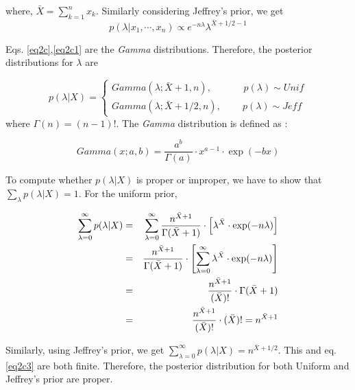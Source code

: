 \documentclass[11pt]{article}
\begin{document}
where, $\bar{X} = \sum\limits_{k=1}^{n} x_k$.  Similarly considering Jeffrey's prior, we get
\vspace{-10pt}
\begin{equation}
  p(\lambda | x_1, \cdots, x_n) \propto  e^{-n\lambda} \lambda^{\bar{X}+1/2-1} 
\label{eq2c1}
\end{equation}

Eqs. \ref{eq2c},\ref{eq2c1} are the \emph{Gamma} distributions. Therefore, the posterior distributions for $\lambda$ are

\begin{equation*}
  p(\lambda | X) = 
\begin{cases}
   Gamma(\lambda; \bar{X}+1, n), \; \; \; \; \; \; \; \; \; \; \; \;  \mbox{$p(\lambda) \sim Unif$} \\
    Gamma(\lambda; \bar{X}+1/2, n), \; \; \; \; \; \; \; \; \mbox{$p(\lambda) \sim Jeff$}
\end{cases}
\end{equation*}
\vspace{-10pt}
where $\Gamma(n) = (n-1)!$. The \emph{Gamma} distribution is defined as :

\vspace{-10pt}
\begin{equation}
Gamma(x; a,b) = \frac{a^b}{\Gamma(a)} \cdot x^{a-1} \cdot \exp(-bx)
\label{eq2c2}
\end{equation}

To compute whether $p(\lambda | X)$ is proper or improper, we have to show that $\sum\limits_{\lambda} p(\lambda | X) = 1$.  For the uniform prior,

\vspace{-20pt}
\begin{eqnarray}
\sum\limits_{\lambda=0}^{\infty} p(\lambda | X) &=& \sum\limits_{\lambda=0}^{\infty} \frac{n^{\bar{X}+1}}{\Gamma(\bar{X}+1)} \cdot \left [ \lambda^{\bar{X}} \cdot \exp(-n\lambda) \right ] \notag \\
&=& \frac{n^{\bar{X}+1}}{\Gamma(\bar{X}+1)} \cdot \left [ \sum\limits_{\lambda=0}^{\infty} \lambda^{\bar{X}} \cdot \exp(-n\lambda) \right ] \notag \\
&=& \frac{n^{\bar{X}+1}}{(\bar{X})!} \cdot \Gamma(\bar{X}+1) \notag \\
&=& \frac{n^{\bar{X}+1}}{(\bar{X})!} \cdot (\bar{X})!  = n^{\bar{X}+1} 
\label{eq2c3}
\end{eqnarray}

Similarly, using Jeffrey's prior, we get $\sum\limits_{\lambda=0}^{\infty} p(\lambda | X) = n^{\bar{X}+1/2}$. This and eq. \ref{eq2c3} are both finite. Therefore, the posterior distribution for both Uniform and Jeffrey's prior are proper. 
\end{document}
